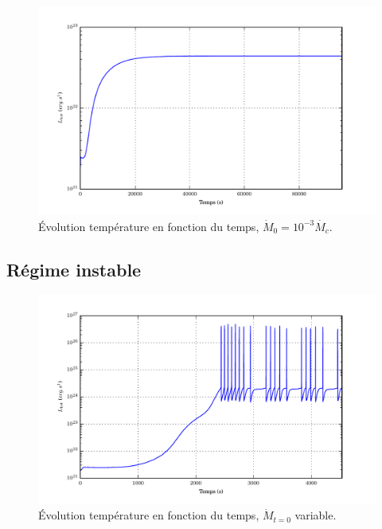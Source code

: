 \documentclass[french]{beamer}
\begin{document}
\begin{frame}
  \begin{figure}
\includegraphics[width=\columnwidth]{figures/Ltot_fonction_t_stable.pdf}
    \caption{Évolution température en fonction du temps, $\dot{M}_0 = 10^{-3}\dot{M_c}$.}
  \end{figure}
\end{frame}

\subsection{Régime instable}

\begin{frame}
  \begin{figure}
    \includegraphics[width=.9\columnwidth]{figures/Ltot_fonction_t.pdf}
    \caption{Évolution température en fonction du temps, $\dot{M}_{t=0}$ variable.}
  \end{figure}  
\end{frame}
\end{document}
